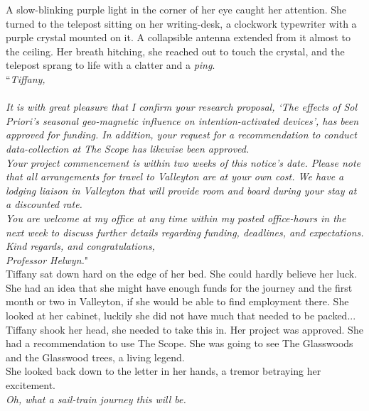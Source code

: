 A slow-blinking purple light in the corner of her eye caught her attention. She turned to the telepost sitting on her writing-desk, a clockwork typewriter with a purple crystal mounted on it. 
A collapsible antenna extended from it almost to the ceiling. 
Her breath hitching, she reached out to touch the crystal, and the telepost sprang to life with a clatter and a \textit{ping}.\\

``\textit{Tiffany,}\\
\\
\textit{It is with great pleasure that I confirm your research proposal, `The effects of Sol Priori's seasonal geo-magnetic influence on intention-activated devices', has been approved for funding. In addition, your request for a recommendation to conduct data-collection at The Scope has likewise been approved.}\\

\textit{Your project commencement is within two weeks of this notice's date. Please note that all arrangements for travel to Valleyton are at your own cost. We have a lodging liaison in Valleyton that will provide room and board during your stay at a discounted rate.}\\

\textit{You are welcome at my office at any time within my posted office-hours in the next week to discuss further details regarding funding, deadlines, and expectations.}\\

\textit{Kind regards, and congratulations,}\\

\textit{Professor Helwyn.}"\\

Tiffany sat down hard on the edge of her bed. 
She could hardly believe her luck.
She had an idea that she might have enough funds for the journey and the first month or two in Valleyton, if she would be able to find employment there.
She looked at her cabinet, luckily she did not have much that needed to be packed...\\

Tiffany shook her head, she needed to take this in.
Her project was approved. 
She had a recommendation to use The Scope. 
She was going to see The Glasswoods and the Glasswood trees, a living legend.\\

She looked back down to the letter in her hands, a tremor betraying her excitement.\\

\textit{Oh, what a sail-train journey this will be.}